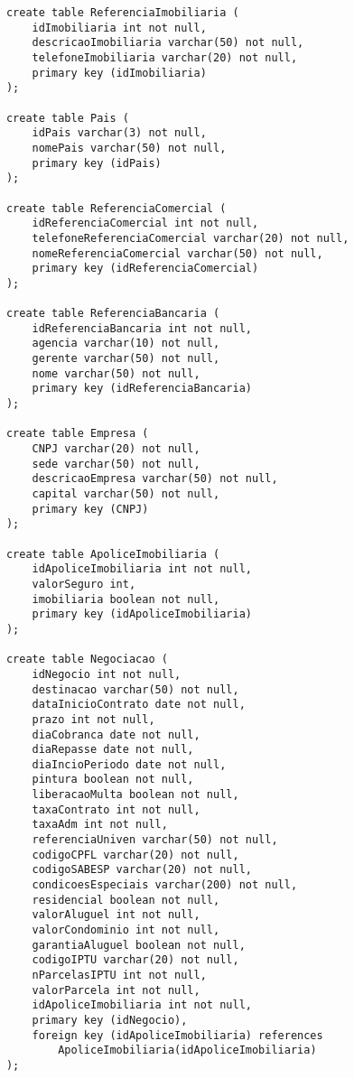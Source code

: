 \documentclass{article}
\begin{document}
\begin{lstlisting}
            create table ReferenciaImobiliaria (
            	idImobiliaria int not null,
            	descricaoImobiliaria varchar(50) not null,
            	telefoneImobiliaria varchar(20) not null,
            	primary key (idImobiliaria)
            );
            
            create table Pais (
            	idPais varchar(3) not null,
            	nomePais varchar(50) not null,
            	primary key (idPais)
            );
            
            create table ReferenciaComercial (
            	idReferenciaComercial int not null, 
            	telefoneReferenciaComercial varchar(20) not null, 
            	nomeReferenciaComercial varchar(50) not null,
            	primary key (idReferenciaComercial)
            );
            
            create table ReferenciaBancaria (
            	idReferenciaBancaria int not null,
            	agencia varchar(10) not null,
            	gerente varchar(50) not null,
            	nome varchar(50) not null,
            	primary key (idReferenciaBancaria)
            );
            
            create table Empresa (
            	CNPJ varchar(20) not null,
            	sede varchar(50) not null,
            	descricaoEmpresa varchar(50) not null,
            	capital varchar(50) not null,
            	primary key (CNPJ)
            );
            
            create table ApoliceImobiliaria (
            	idApoliceImobiliaria int not null,
            	valorSeguro int,
            	imobiliaria boolean not null,
            	primary key (idApoliceImobiliaria)
            );
            
            create table Negociacao (
            	idNegocio int not null, 
            	destinacao varchar(50) not null, 
            	dataInicioContrato date not null, 
            	prazo int not null, 
            	diaCobranca date not null, 
            	diaRepasse date not null, 
            	diaIncioPeriodo date not null, 
            	pintura boolean not null, 
            	liberacaoMulta boolean not null, 
            	taxaContrato int not null, 
            	taxaAdm int not null, 
            	referenciaUniven varchar(50) not null, 
            	codigoCPFL varchar(20) not null, 
            	codigoSABESP varchar(20) not null, 
            	condicoesEspeciais varchar(200) not null, 
            	residencial boolean not null, 
            	valorAluguel int not null, 
            	valorCondominio int not null, 
            	garantiaAluguel boolean not null, 
            	codigoIPTU varchar(20) not null, 
            	nParcelasIPTU int not null, 
            	valorParcela int not null, 
            	idApoliceImobiliaria int not null,
            	primary key (idNegocio),
            	foreign key (idApoliceImobiliaria) references 
            	    ApoliceImobiliaria(idApoliceImobiliaria)
            );
            

\end{lstlisting}
\end{document}
